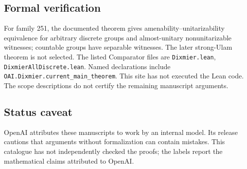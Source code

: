 \documentclass[11pt]{article}
\begin{document}
\subsection{Formal verification}
For family 251, the documented theorem gives amenability--unitarizability equivalence for arbitrary discrete groups and almost-unitary nonunitarizable witnesses; countable groups have separable witnesses. The later strong-Ulam theorem is not selected. The listed Comparator files are \texttt{Dixmier.lean}, \texttt{DixmierAllDiscrete.lean}. Named declarations include \texttt{OAI.Dixmier.current\_main\_theorem}. This site has not executed the Lean code. The scope descriptions do not certify the remaining manuscript arguments.

\subsection{Status caveat}
OpenAI attributes these manuscripts to work by an internal model. Its release cautions that arguments without formalization can contain mistakes. This catalogue has not independently checked the proofs; the labels report the mathematical claims attributed to OpenAI.
\end{document}
